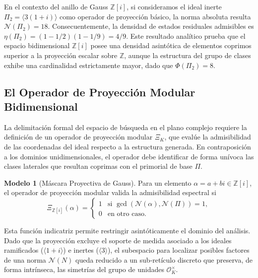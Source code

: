 \documentclass{article}
\numberwithin{equation}{section}
\theoremstyle{plain}
\theoremstyle{definition}
\newtheorem{modelo}[teorema]{Modelo}
\begin{document}
En el contexto del anillo de Gauss $\mathbb{Z}[i]$, si consideramos el ideal inerte $\Pi_2 = \langle 3(1+i) \rangle$ como operador de proyección básico, la norma absoluta resulta $\mathcal{N}(\Pi_2) = 18$. Consecuentemente, la densidad de estados residuales admisibles es $\eta(\Pi_2) = (1 - 1/2)(1 - 1/9) = 4/9$. Este resultado analítico prueba que el espacio bidimensional $\mathbb{Z}[i]$ posee una densidad asintótica de elementos coprimos superior a la proyección escalar sobre $\mathbb{Z}$, aunque la estructura del grupo de clases exhibe una cardinalidad estrictamente mayor, dado que $\Phi(\Pi_2) = 8$.

\subsection{El Operador de Proyección Modular Bidimensional}

La delimitación formal del espacio de búsqueda en el plano complejo requiere la definición de un operador de proyección modular $\Xi_K$, que evalúe la admisibilidad de las coordenadas del ideal respecto a la estructura generada. En contraposición a los dominios unidimensionales, el operador debe identificar de forma unívoca las clases laterales que resultan coprimas con el primorial de base $\Pi$.

\begin{modelo}[Máscara Proyectiva de Gauss]
Para un elemento $\alpha = a + bi \in \mathbb{Z}[i]$, el operador de proyección modular valida la admisibilidad espectral si
\begin{equation}
    \Xi_{\mathbb{Z}[i]}(\alpha) = 
    \begin{cases} 
    1 & \text{si } \gcd(\mathcal{N}(\alpha), \mathcal{N}(\Pi)) = 1, \\
    0 & \text{en otro caso.}
    \end{cases}
\end{equation}
\end{modelo}

Esta función indicatriz permite restringir asintóticamente el dominio del análisis. Dado que la proyección excluye el soporte de medida asociado a los ideales ramificados ($\langle 1+i \rangle$) e inertes ($\langle 3 \rangle$), el subespacio para localizar posibles factores de una norma $\mathcal{N}(N)$ queda reducido a un sub-retículo discreto que preserva, de forma intrínseca, las simetrías del grupo de unidades $\mathcal{O}_K^\times$.

\end{document}
